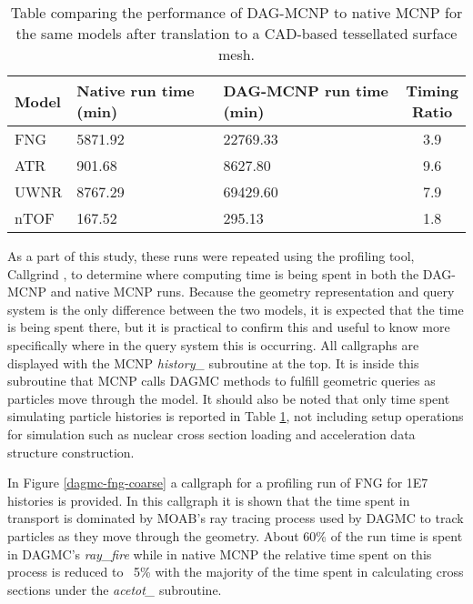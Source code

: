 \begin{table}[H]
  \centering
  \begin{tabular}{l l l c}
    \toprule
    Model & Native run time (min) & DAG-MCNP run time (min) & \thead{Timing \\ Ratio} \\
    \hline
    FNG   & 5871.92           & 22769.33            & 3.9   \\
    ATR   & 901.68            & 8627.80             & 9.6   \\
    UWNR  & 8767.29           & 69429.60            & 7.9   \\
    nTOF  & 167.52            & 295.13              & 1.8   \\
    \hline
  \end{tabular}
  \caption[DAG-MCNP performance benchmarking.]{Table comparing the performance of DAG-MCNP to native MCNP for the
    same models after translation to a CAD-based tessellated surface mesh.}
  \label{dag-mcnp-benchmarks}  
\end{table}

As a part of this study, these runs were repeated using the profiling tool,
Callgrind \cite{Pena_2016}, to determine where computing time is being spent in
both the DAG-MCNP and native MCNP runs. Because the geometry representation and
query system is the only difference between the two models, it is expected that
the time is being spent there, but it is practical to confirm this and useful to
know more specifically where in the query system this is occurring. All
callgraphs are displayed with the MCNP \textit{history\_} subroutine at the
top. It is inside this subroutine that MCNP calls DAGMC methods to fulfill geometric
queries as particles move through the model. It should also be noted that only time spent simulating
particle histories is reported in Table \ref{dag-mcnp-benchmarks}, not including
setup operations for simulation such as nuclear cross section loading and
acceleration data structure construction.

In Figure \ref{dagmc-fng-coarse} a callgraph for a profiling run of FNG for \num{1E7}
histories is provided. In this callgraph it is shown that the time spent in
transport is dominated by MOAB's ray tracing process used by DAGMC to track
particles as they move through the geometry. About 60\% of the run time  is spent
in DAGMC's \textit{ray\_fire} while in native MCNP the relative time spent on
this process is reduced to ~5\% with the majority of the time spent in
calculating cross sections under the \textit{acetot\_} subroutine.

